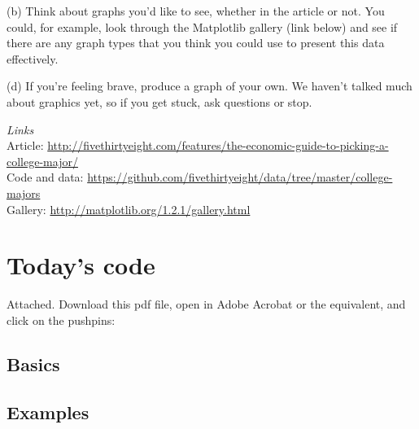 \documentclass[11pt]{article}
\begin{document}
\begin{itemize}
(b) Think about graphs you'd like to see, whether in the article or
not.  You could, for example, look through the Matplotlib gallery
(link below) and see if there are any graph types that you think you
could use to present this data effectively.

(d) If you're feeling brave, produce a graph of your own.  We haven't
talked much about graphics yet, so if you get stuck, ask questions or stop.

{\it Links\/} \\
Article:  \url{http://fivethirtyeight.com/features/the-economic-guide-to-picking-a-college-major/} \\
Code and data:
\url{https://github.com/fivethirtyeight/data/tree/master/college-majors} \\
Gallery:  \url{http://matplotlib.org/1.2.1/gallery.html}


\end{itemize}

\section*{Today's code}

Attached.  Download this pdf file, open in Adobe Acrobat or the equivalent,
and click on the pushpins:

\subsection*{Basics}
{\small

}

\subsection*{Examples}

{\small

}
\end{document}
